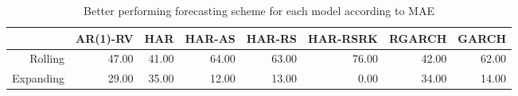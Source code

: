 \begin{table}[ht]
\centering
\begin{tabular}{rrrrrrrr}
  \hline
 & AR(1)-RV & HAR & HAR-AS & HAR-RS & HAR-RSRK & RGARCH & GARCH \\ 
  \hline
Rolling & 47.00 & 41.00 & 64.00 & 63.00 & 76.00 & 42.00 & 62.00 \\ 
  Expanding & 29.00 & 35.00 & 12.00 & 13.00 & 0.00 & 34.00 & 14.00 \\ 
   \hline
\end{tabular}
\caption[Better scheme MAE summary]{Better performing forecasting scheme for each model according to MAE} 
\label{Table:Better_MAE_summary}
\end{table}
